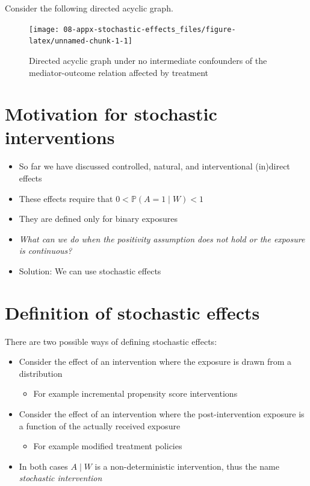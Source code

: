 \documentclass[
  12pt,
]{book}
\providecommand{\tightlist}{%
  \setlength{\itemsep}{0pt}\setlength{\parskip}{0pt}}
\theoremstyle{definition}
\theoremstyle{definition}
\theoremstyle{definition}
\renewcommand{\P}{\mathbb{P}}
\newcommand{\1}{\mathbbm{1}}
\begin{document}
Consider the following directed acyclic graph.

\begin{figure}

{\centering \texttt{[image: 08-appx-stochastic-effects\_files/figure-latex/unnamed-chunk-1-1]} 

}

\caption{Directed acyclic graph under no intermediate confounders of the mediator-outcome relation affected by treatment}\label{fig:unnamed-chunk-1}
\end{figure}

\hypertarget{motivation-for-stochastic-interventions}{%
\section{Motivation for stochastic interventions}\label{motivation-for-stochastic-interventions}}

\begin{itemize}
\tightlist
\item
  So far we have discussed controlled, natural, and interventional (in)direct effects
\item
  These effects require that \(0 < \P(A=1\mid W) < 1\)
\item
  They are defined only for binary exposures
\item
  \emph{What can we do when the positivity assumption does not hold or the exposure
  is continuous?}
\item
  Solution: We can use stochastic effects
\end{itemize}

\hypertarget{definition-of-stochastic-effects}{%
\section{Definition of stochastic effects}\label{definition-of-stochastic-effects}}

There are two possible ways of defining stochastic effects:

\begin{itemize}
\tightlist
\item
  Consider the effect of an intervention where the exposure is drawn from a
  distribution

  \begin{itemize}
  \tightlist
  \item
    For example incremental propensity score interventions
  \end{itemize}
\item
  Consider the effect of an intervention where the post-intervention exposure is
  a function of the actually received exposure

  \begin{itemize}
  \tightlist
  \item
    For example modified treatment policies
  \end{itemize}
\item
  In both cases \(A \mid W\) is a non-deterministic intervention, thus the name
  \emph{stochastic intervention}
\end{itemize}
\end{document}
